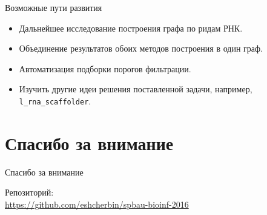 \documentclass{beamer}
\begin{document}
\begin{frame}[t]{Возможные пути развития}
    \begin{itemize}
    \item
        Дальнейшее исследование построения графа по ридам РНК.
    \item
        Объединение результатов обоих методов построения в один граф.
    \item
        Автоматизация подборки порогов фильтрации.
    \item
        Изучить другие идеи решения поставленной задачи, например, 
        \texttt{l\_rna\_scaffolder}.
    \end{itemize}
\end{frame}

\section{Спасибо за внимание}
\begin{frame}{Спасибо за внимание}
    \begin{center}
        Репозиторий: \\ \url{https://github.com/eshcherbin/spbau-bioinf-2016}
    \end{center}
\end{frame}
\end{document}
